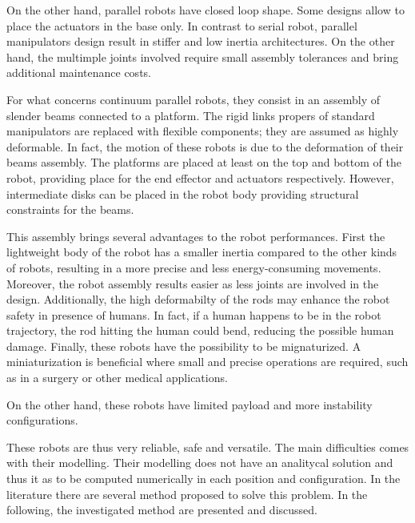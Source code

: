 \documentclass{thesisreport}
\begin{document}
 On the other hand, parallel robots have closed loop shape. Some designs allow to place the actuators in the base only. In contrast to serial robot, parallel manipulators design result in stiffer and low inertia architectures. On the other hand, the multimple joints involved require small assembly tolerances and bring additional maintenance costs.
 
 For what concerns continuum parallel robots, they consist in an assembly of slender beams connected to a platform. The rigid links propers of standard manipulators are replaced with flexible components; they are assumed as highly deformable. In fact, the motion of these robots is due to the deformation of their beams assembly.
 The platforms are placed at least on the top and bottom of the robot, providing place for the end effector and actuators respectively. However, intermediate disks can be placed in the robot body providing structural constraints for the beams.  
 
 This assembly brings several advantages to the robot performances. First the lightweight body of the robot has a smaller inertia compared to the other kinds of robots, resulting in a more precise and less energy-consuming movements. Moreover, the robot assembly results easier as less joints are involved in the design. Additionally, the high deformabilty of the rods may enhance the robot safety in presence of humans. In fact, if a human happens to be in the robot trajectory, the rod hitting the human could bend, reducing the possible human damage. Finally, these robots have the possibility to be mignaturized. A miniaturization is beneficial where small and precise operations are required, such as in a surgery or other medical applications. 
 
 On the other hand, these robots have limited payload and more instability configurations.
 
 These robots are thus very reliable, safe and versatile. The main difficulties comes with their modelling. Their modelling does not have an analitycal solution and thus it as to be computed numerically in each position and configuration. In the literature there are several method proposed to solve this problem. In the following, the investigated method are presented and discussed.
 
\end{document}
